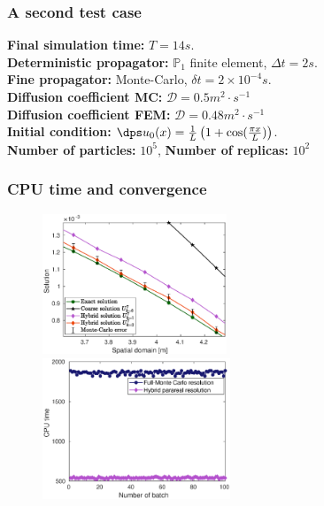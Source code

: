 \documentclass[aspectratio=169]{beamer}
\begin{document}
%
\begin{frame}
  \frametitle{A second test case}
  \textbf{Final simulation time:} $T=14 s$.
\\
\vspace{0.3 cm}
\textbf{Deterministic propagator:} $\mathbb{P}_1$ finite element, $\Delta t = 2 s$.
\\
\vspace{0.3 cm}
\textbf{Fine propagator:} Monte-Carlo, $\delta t = 2 \times 10^{-4} s$.
\\
\vspace{0.3 cm}
\textbf{Diffusion coefficient MC:} $\mathcal{D} = 0.5 m^2 \cdot s^{-1}$
\\
\vspace{0.3 cm}
\textbf{Diffusion coefficient FEM:} $\mathcal{D}=0.48 m^2 \cdot s^{-1}$
\\
\vspace{0.3 cm}
\textbf{Initial condition:} $\dps u_0(x)=\frac{1}{L} \left(1 + \cos(\frac{\pi x}{L}) \right)$.
\\
\vspace{0.3 cm}
\textbf{Number of particles:} $10^5$, \textbf{Number of replicas:} $10^2$
\end{frame}
%
\begin{frame}
  \frametitle{CPU time and convergence}
  \begin{figure}
\centering
\includegraphics[width=0.49\textwidth]{image/sol_k1_k2_zoom}
\includegraphics[width=0.5\textwidth]{image/CPU_time_trigo}
\end{figure}
\end{frame}
\end{document}
